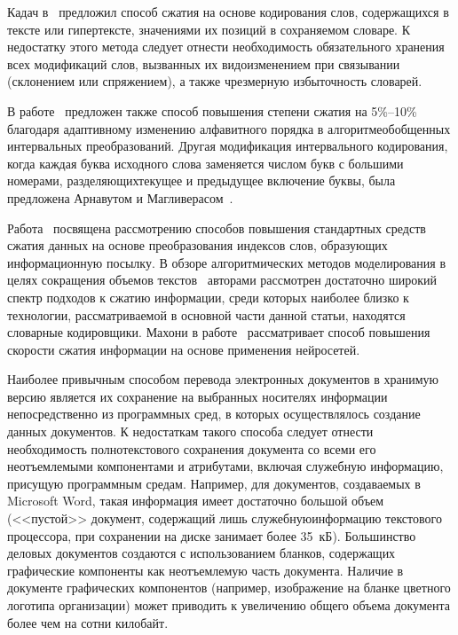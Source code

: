 \begin{multicols}{2}
Кадач в~\cite{5che} предложил способ сжатия на основе 
кодирования слов, содержащихся в тексте или гипертексте, значениями их 
позиций в сохраняемом словаре. К недостатку этого метода следует отнести 
необходимость обязательного хранения всех модификаций слов, вызванных их 
видоизменением при связывании (склонением или спряжением), а также 
чрезмерную избыточность словарей.
     
     В работе~\cite{5che} предложен также способ повышения степени сжатия 
на 5\%--10\% благодаря адаптивному изменению алфавитного порядка в 
алгоритме\linebreak обобщенных интервальных преобразований. Другая модификация 
интервального кодирования, когда каждая буква исходного слова заменяется 
чис\-лом букв с большими номерами, разделяющих\linebreak текущее и предыдущее 
включение буквы, была предложена Арнавутом и 
Магливерасом~\cite{17che}.
     
     Работа~\cite{18che} посвящена рассмотрению способов повышения 
стандартных средств сжатия данных на основе преобразования индексов слов, 
образующих информационную посылку. В обзоре алгоритмических методов 
моделирования в целях сокращения объемов текстов~\cite{19che} авторами 
рассмотрен достаточно широкий спектр подходов к сжатию информации, среди 
которых наиболее близко к технологии, рассматриваемой в основной части 
данной статьи, находятся словарные кодировщики. Махони в 
работе~\cite{20che} рассматривает способ повышения скорости сжатия 
информации на основе применения нейросетей. 
     
     Наиболее привычным способом перевода электронных документов в 
хранимую версию является их сохранение на выбранных носителях информации 
непосредственно из программных сред, в которых осуществлялось создание 
данных документов. К недостаткам такого способа следует отнести 
необходимость полнотекстового сохранения документа со всеми его 
неотъемлемыми компонентами и атрибутами, включая служебную информацию, 
присущую программным средам. Например, для документов, создаваемых в 
Microsoft Word, такая информация имеет достаточно большой объем 
(<<пустой>> документ, содержащий лишь служебную\linebreak информацию текстового 
процессора, при сохранении на диске занимает более 35~кБ). Большинство 
деловых документов создаются с использованием бланков, содержащих 
графические\linebreak
компоненты как неотъемлемую часть документа. Наличие в 
документе графических компонентов (например, изображение на бланке 
цветного логотипа организации) может приводить к увеличению общего объема 
документа более чем на сотни килобайт.
     

\end{multicols}
